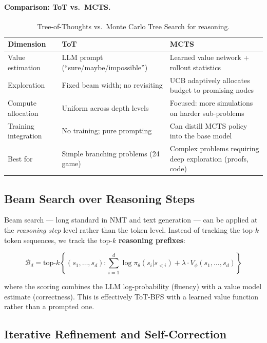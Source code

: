 \paragraph{Comparison: ToT vs.~MCTS.}
\label{comparison-tot-vs.-mcts.}

\begin{table}[ht!]
\centering
\caption{Tree-of-Thoughts vs.~Monte Carlo Tree Search for reasoning.}
\begin{tabular}{@{}lp{5cm}p{8cm}@{}}
\toprule
\textbf{Dimension} & \textbf{ToT} & \textbf{MCTS} \\
\midrule
Value estimation & LLM prompt (``sure/maybe/impossible'') & Learned value network + rollout statistics \\
Exploration & Fixed beam width; no revisiting & UCB adaptively allocates budget to promising nodes \\
Compute allocation & Uniform across depth levels & Focused: more simulations on harder sub-problems \\
Training integration & No training; pure prompting & Can distill MCTS policy into the base model~\cite{silver2016mastering} \\
Best for & Simple branching problems (24 game) & Complex problems requiring deep exploration (proofs, code) \\
\bottomrule
\end{tabular}
\end{table}

\subsection{Beam Search over Reasoning Steps}
\label{subsec:beam_reasoning}

Beam search --- long standard in NMT and text generation --- can be applied at the \emph{reasoning step} level rather than the token level. Instead of tracking the top-$k$ token sequences, we track the top-$k$ \textbf{reasoning prefixes}:

\begin{equation}
\mathcal{B}_d = \text{top-}k\left\{ (s_1, \ldots, s_d) : \sum_{i=1}^d \log \pi_\theta(s_i | s_{<i}) + \lambda \cdot V_\phi(s_1, \ldots, s_d) \right\}
\end{equation}

where the scoring combines the LLM log-probability (fluency) with a value model estimate (correctness). This is effectively ToT-BFS with a learned value function rather than a prompted one.

\subsection{Iterative Refinement and Self-Correction}
\label{iterative-refinement-and-self-correction}


